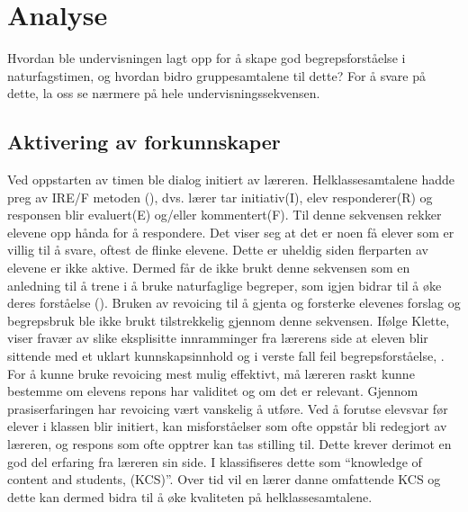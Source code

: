 \documentclass[main.tex]{subfiles}
\begin{document}
\section*{Analyse}
\label{sec:2}

Hvordan ble undervisningen lagt opp for å skape god begrepsforståelse i naturfagstimen, og hvordan 
bidro gruppesamtalene til dette? For å svare på dette, la oss se nærmere på hele 
undervisningssekvensen.

\subsection*{Aktivering av forkunnskaper}
Ved oppstarten av timen ble dialog initiert av læreren. Helklassesamtalene hadde preg av
IRE/F metoden (), dvs. lærer tar initiativ(I), elev responderer(R) og responsen blir 
evaluert(E) og/eller kommentert(F). Til denne sekvensen rekker elevene opp hånda for å respondere. 
Det viser seg at det er noen få elever som er villig til å svare, oftest de flinke elevene. Dette 
er uheldig siden flerparten av elevene er ikke aktive. Dermed får de ikke brukt denne sekvensen som
en anledning til å trene i å bruke naturfaglige begreper, som igjen bidrar til å øke deres forståelse
().
\newline
\newline
Bruken av revoicing til å gjenta og forsterke elevenes forslag og begrepsbruk ble ikke brukt 
tilstrekkelig gjennom denne sekvensen. Ifølge Klette, viser fravær av slike eksplisitte 
innramminger fra lærerens side at eleven blir sittende med et uklart kunnskapsinnhold og i 
verste fall feil begrepsforståelse, . For å kunne bruke revoicing 
mest mulig effektivt, må læreren raskt kunne bestemme om elevens repons har validitet 
og om det er relevant. Gjennom prasiserfaringen har revoicing vært vanskelig å utføre. Ved å 
forutse elevsvar før elever i klassen blir initiert, kan misforståelser som ofte oppstår bli 
redegjort av læreren, og respons som ofte opptrer kan tas stilling til. Dette krever derimot 
en god del erfaring fra læreren sin side. I  klassifiseres dette som 
``knowledge of content and students, (KCS)''. Over tid vil en lærer danne omfattende KCS og
dette kan dermed bidra til å øke kvaliteten på helklassesamtalene. 
\end{document}
